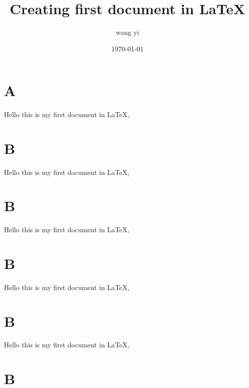 \documentclass{article}
\title{Creating first document in \LaTeX}
\author{wang yi}
\date{\today}
\begin{document}
    \maketitle
    \tableofcontents
    \newpage
	\setcounter{page}{1}
    \section{A}
    \paragraph{}
Hello this is  my first document in LaTeX,\\
    \section{B}
    \paragraph{}
    Hello this is  my first document in LaTeX,\\
    \section{B}
    \paragraph{}
    Hello this is  my first document in LaTeX,\\
    \section{B}
    \paragraph{}
    Hello this is  my first document in LaTeX,\\
    \section{B}
    \paragraph{}
    Hello this is  my first document in LaTeX,\\
    \section{B}
\end{document}
